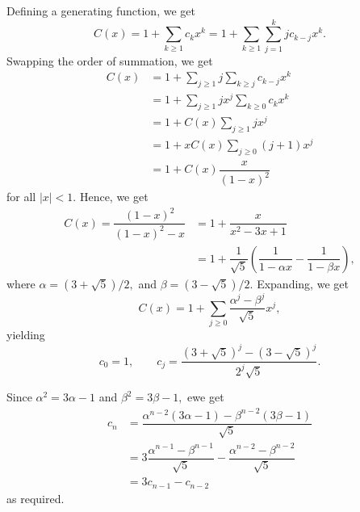 \documentclass[12pt]{article}
\begin{document}
\begin{enumerate}
    Defining a generating function, we get
    $$
    C(x) = 1 + \sum_{k \geq 1} c_k x^k = 1 + \sum_{k \geq 1} \sum_{j
    = 1}^{k} jc_{k - j} x^k.
    $$
    Swapping the order of summation, we get
    \begin{align*}
      C(x) &= 1 + \sum_{j \geq 1} j\sum_{k \geq j} c_{k -j} x^k \\
      &=1 +  \sum_{j \geq 1} jx ^j\sum_{k \geq 0} c_{k} x^{k} \\
      &= 1 + C(x)\sum_{j \geq 1} jx^j \\
      &= 1+ xC(x) \sum_{j \geq 0} (j+1)x^{j} \\
      &= 1 + C(x) \dfrac{x}{(1-x)^2}
    \end{align*}
    for all $|x| < 1.$ Hence, we get
    \begin{align*}
      C(x) = \dfrac{(1-x)^2}{(1-x)^2 - x} &= 1 + \dfrac{x}{x^2 -3x + 1} \\
      &= 1  + \dfrac{1}{\sqrt{5}} \left(
        \dfrac{1}{1 - \alpha x} - \dfrac{1}{1-\beta x}
      \right),
    \end{align*}
    where $\alpha = (3 + \sqrt 5)/2,$ and $\beta = (3 - \sqrt 5)/2.$
    Expanding, we get
    $$
    C(x) = 1 + \sum_{j \geq 0} \dfrac{\alpha^j - \beta^j}{\sqrt 5} x^j,
    $$
    yielding
    $$
    c_0 = 1, \qquad c_j = \dfrac{(3 + \sqrt 5 )^j - (3 - \sqrt
    5)^j}{2^j\sqrt 5}.
    $$

    Since $\alpha^2 = 3\alpha -1 $  and $\beta^ 2 = 3\beta - 1,$ ewe get
    \begin{align*}
      c_n &= \dfrac{\alpha^{n-2}(3 \alpha - 1) - \beta^{n-2}(3 \beta
      - 1)}{\sqrt 5} \\
      &=3 \dfrac{\alpha^{n-1} - \beta^{n-1}}{\sqrt 5} -
      \dfrac{\alpha^{n-2} - \beta^{n-2}}{\sqrt 5} \\
      &= 3 c_{n-1} - c_{n-2}
    \end{align*}
    as required.
\end{enumerate}
\end{document}
